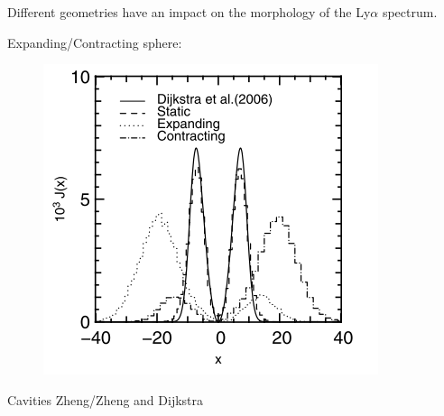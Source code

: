 \documentclass{beamer}
\begin{document}
\begin{frame}
\LARGE{Different geometries have an impact on the morphology of the 
Ly$\alpha$ spectrum.}
\end{frame}

\begin{frame}{Expanding/Contracting sphere:}
\begin{figure}
\includegraphics[scale=0.4]{Figures/expanding.png}
\end{figure}
\end{frame}

\begin{frame}{Cavities}
Zheng/Zheng and Dijkstra
\end{frame}
\end{document}
